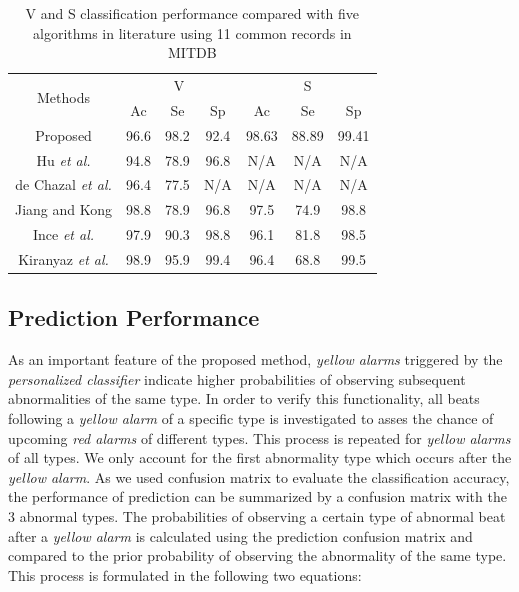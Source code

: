 \begin{table}[tbp]
\centering
\caption{V and S classification performance compared with five algorithms in literature using 11 common records in MITDB}
\label{table:classification_comp}
\begin{tabular}{|c|c|c|c|c|c|c|}
\hline
\multirow{2}{*}{Methods} & \multicolumn{3}{c|}{V} & \multicolumn{3}{c|}{S} \\ \cline{2-7} 
                         & Ac     & Se     & Sp     & Ac      & Se     & Sp     \\ \hline
Proposed                 & 96.6   & 98.2   & 92.4   & 98.63   & 88.89  & 99.41  \\ \hline
Hu \textit{et al.}\cite{Hu_et_al}     & 94.8   & 78.9   & 96.8   & N/A     & N/A    & N/A    \\ \hline
de Chazal \textit{et al.}\cite{autofs}  & 96.4   & 77.5   & N/A    & N/A     & N/A    & N/A    \\ \hline
Jiang and Kong \cite{bbnn}    & 98.8   & 78.9   & 96.8   & 97.5    & 74.9   & 98.8   \\ \hline
Ince \textit{et al.} \cite{ince2009generic}    & 97.9   & 90.3   & 98.8   & 96.1    & 81.8   & 98.5   \\ \hline
Kiranyaz \textit{et al.}\cite{Kiranyaz}         & 98.9   & 95.9   & 99.4   & 96.4    & 68.8   & 99.5   \\ \hline
\end{tabular}
\end{table}

\subsection{Prediction Performance}

As an important feature of the proposed method, \textit{yellow alarms} triggered by the \textit{personalized classifier} indicate higher probabilities of observing subsequent abnormalities of the same type. In order to verify this functionality, all beats following a \textit{yellow alarm} of a specific type is investigated to asses the chance of upcoming \textit{red alarms} of different types. This process is repeated for \textit{yellow alarms} of all types. We only account for the first abnormality type which occurs after the \textit{yellow alarm}. As we used confusion matrix to evaluate the classification accuracy, the performance of prediction can be summarized by a confusion matrix with the 3 abnormal types. The probabilities of observing a certain type of abnormal beat after a \textit{yellow alarm} is calculated using the prediction confusion matrix and compared to the prior probability of observing the abnormality of the same type. This process is formulated in the following two equations:

